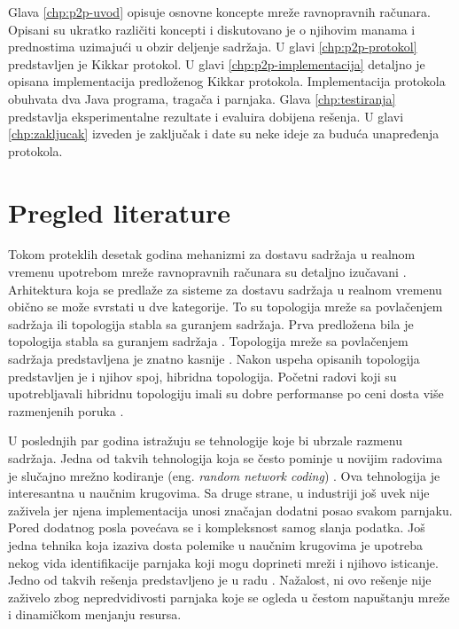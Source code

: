 \documentclass[12pt,oneside]{memoir}
\begin{document}
Glava \ref{chp:p2p-uvod} opisuje osnovne koncepte mreže ravnopravnih računara. Opisani su ukratko različiti koncepti i diskutovano je o njihovim manama i prednostima uzimajući u obzir deljenje sadržaja. U glavi \ref{chp:p2p-protokol} predstavljen je Kikkar protokol. U glavi \ref{chp:p2p-implementacija} detaljno je opisana implementacija predloženog Kikkar protokola. Implementacija protokola obuhvata dva Java programa, tragača i parnjaka. Glava \ref{chp:testiranja} predstavlja eksperimentalne rezultate i evaluira dobijena rešenja. U glavi \ref{chp:zakljucak} izveden je zaključak i date su neke ideje za buduća unapređenja protokola.
 

\section{Pregled literature}
\label{pregled.1}

Tokom proteklih desetak godina mehanizmi za dostavu sadržaja u realnom vremenu upotrebom mreže ravnopravnih računara su detaljno izučavani \cite{Zhang:2012:SPL:2365364.2365643}. Arhitektura koja se predlaže za sisteme za dostavu sadržaja u realnom vremenu obično se može svrstati u dve kategorije. To su topologija mreže sa povlačenjem sadržaja ili topologija stabla sa guranjem sadržaja. Prva predložena bila je topologija stabla sa guranjem sadržaja \cite{Venkata}. Topologija mreže sa povlačenjem sadržaja predstavljena je znatno kasnije \cite{ZhangLiu}. Nakon uspeha opisanih topologija predstavljen je i njihov spoj, hibridna topologija. Početni radovi koji su upotrebljavali hibridnu topologiju imali su dobre performanse po ceni dosta više razmenjenih poruka \cite{HAMMAMI2014158}. 

U poslednjih par godina istražuju se tehnologije koje bi ubrzale razmenu sadržaja. Jedna od takvih tehnologija koja se često pominje u novijim radovima je slučajno mrežno kodiranje (eng. \textit{random network coding}) \cite{Nguyen5462032}. Ova tehnologija je interesantna u naučnim krugovima. Sa druge strane, u industriji još uvek nije zaživela jer njena implementacija unosi značajan dodatni posao svakom parnjaku. 
Pored dodatnog posla povećava se i kompleksnost samog slanja podatka. Još jedna tehnika koja izaziva dosta polemike u naučnim krugovima je upotreba nekog vida identifikacije parnjaka koji mogu doprineti mreži i njihovo isticanje. Jedno od takvih rešenja predstavljeno je u radu \cite{Esch6077117}. Nažalost, ni ovo rešenje nije zaživelo zbog nepredvidivosti parnjaka koje se ogleda u čestom napuštanju mreže i dinamičkom menjanju resursa.
\end{document}
